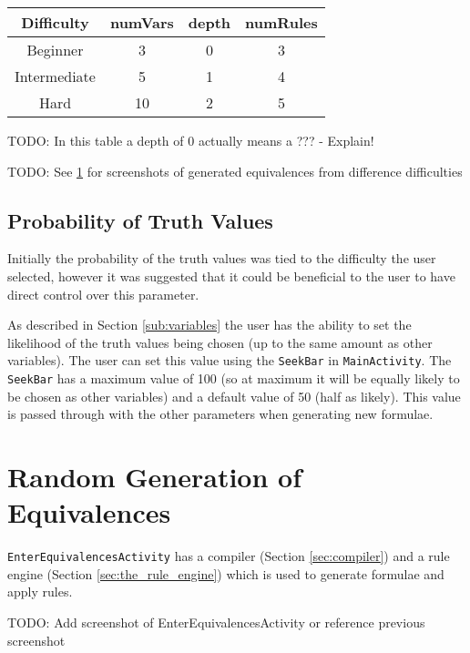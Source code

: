 \documentclass{report}
\begin{document}
\vspace{5mm}
\begin{center}
  \begin{tabular}{ | c | c | c | c | }
    \hline
    Difficulty & numVars & depth & numRules \\ \hline
    Beginner & 3 & 0 & 3 \\
    Intermediate & 5 & 1 & 4 \\
    Hard & 10 & 2 & 5 \\
    \hline
  \end{tabular}
\end{center}
\vspace{5mm}

TODO: In this table a depth of 0 actually means a ??? - Explain!

TODO: See \ref{sec:app_generation_of_equivalences} for screenshots of generated equivalences from difference difficulties

\subsection{Probability of Truth Values}

Initially the probability of the truth values was tied to the difficulty the user selected, however it was suggested that it could be beneficial to the user to have direct control over this parameter. 

As described in Section \ref{sub:variables} the user has the ability to set the likelihood of the truth values being chosen (up to the same amount as other variables). The user can set this value using the {\tt SeekBar} in {\tt MainActivity}. The {\tt SeekBar} has a maximum value of 100 (so at maximum it will be equally likely to be chosen as other variables) and a default value of 50 (half as likely). This value is passed through with the other parameters when generating new formulae.

\section{Random Generation of Equivalences}
\label{sec:app_generation_of_equivalences}

{\tt EnterEquivalencesActivity} has a compiler (Section \ref{sec:compiler}) and a rule engine (Section \ref{sec:the_rule_engine}) which is used to generate formulae and apply rules.

TODO: Add screenshot of EnterEquivalencesActivity or reference previous screenshot
\end{document}
